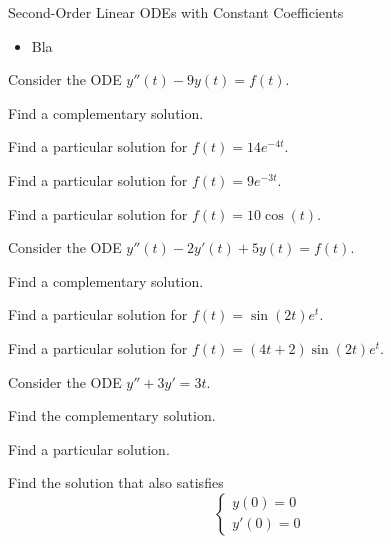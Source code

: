 \begin{module}{Second-Order Linear ODEs with Constant Coefficients}
	\label{2nd:solving}

	
	
\end{module}



\begin{lesson}

	\begin{itemize}
		\item Bla
	\end{itemize}
	

\end{lesson}




\question
	Consider the ODE \quad $y''(t) -9y(t) = f(t)$.
\begin{parts}
	\item Find a complementary solution.
	\item Find a particular solution for $f(t) = 14 e^{-4t}$.
	\item Find a particular solution for $f(t) = 9 e^{-3t}$.
	\item Find a particular solution for $f(t) = 10\cos(t)$.
\end{parts}

\bookonlynewpage


\question
	Consider the ODE \quad $y''(t) -2y'(t)+5y(t) = f(t)$. %
\begin{parts}
	\item Find a complementary solution.
	\item Find a particular solution for $f(t) = \sin(2t)e^t$.
	\item Find a particular solution for $f(t) = (4t+2)\sin(2t)e^t$.
\end{parts}




\bookonlynewpage


\question
	Consider the ODE \quad $y'' + 3y' = 3t$.
\begin{parts}
	\item Find the complementary solution.
	\item Find a particular solution.
	\item Find the solution that also satisfies
	$$ \begin{cases}
		y(0)=0 \\
		y'(0)=0
	\end{cases}$$
\end{parts}





